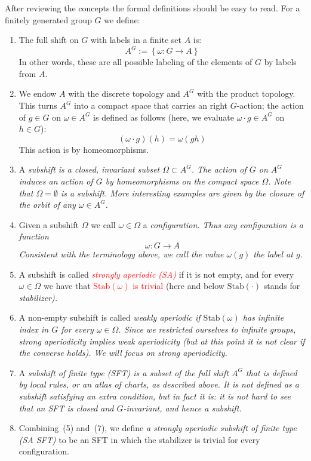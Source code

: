 \documentclass[12pt,reqno]{amsart}
\theoremstyle{plain}
\theoremstyle{definition}
\numberwithin{subcase}{case}
\theoremstyle{plain}
\theoremstyle{definition}
\def\stab[#1]{\mathrm{Stab}(#1)}
\def\cor[#1]{\textcolor{red}{#1}}
\begin{document}
After reviewing the concepts the formal definitions should be easy to read. For a finitely generated group \(G\) we define:

\begin{enumerate}%
\item The full shift on \(G\) with labels in a finite set \(A\) is: 
\[
A^{G} := \left\{ \omega : G \to A\right\}
\]
In other words, these are all possible labeling of the elements of \(G\) by labels from \(A\).

\item We endow \(A\) with the discrete topology and \(A^{G}\) with the product topology. This turns \(A^{G}\) into a compact space that carries an right \(G\)-action; the action of \(g \in G\) on \(\omega \in A^{G}\) is defined as follows (here, we evaluate \(\omega \cdot g \in A^{G}\) on \(h \in G\)):
\[
(\omega \cdot g) (h) = \omega(gh)
\]
This action is by homeomorphisms.

\item A \em subshift \em is a closed, invariant subset \(\Omega \subset A^{G}\). The action of \(G\) on \(A^{G}\) induces an action of \(G\) by homeomorphisms on the compact space \(\Omega\). Note that \(\Omega = \emptyset\) is a subshift. More interesting examples are given by the closure of the orbit of any \(\omega \in A^{G}\).

\item Given a subshift \(\Omega\) we call \(\omega \in \Omega\) a \em configuration\em. Thus any configuration is a function
\[
\omega: G \to A
\]
Consistent with the terminology above, we call the value \(\omega(g)\) the \em label \em at \(g\).

\item A subshift is called \cor[\em strongly aperiodic (SA)] if it is not empty, and for every \(\omega \in \Omega\) we have that \textcolor{red}{\(\stab[\omega]\) is trivial} (here and below \(\stab[\cdot]\) stands for \em stabilizer\em).

\item A non-empty subshift is called \em weakly aperiodic  \em  if \(\stab[\omega]\) has infinite index in \(G\) for every \(\omega \in \Omega\). Since we restricted ourselves to infinite groups, strong aperiodicity implies weak aperiodicity (but at this point it is not clear if the converse holds). We will focus on strong aperiodicity. 

\item A \em subshift of finite type (SFT) \em is a subset of the full shift \(A^{G}\) that is defined by local rules, or an atlas of charts, as described above. It is not defined as a subshift satisfying an extra condition, but in fact it is: it is not hard to see that an SFT is closed and \(G\)-invariant, and hence a subshift.

\item Combining~(5) and~(7), we define {\it a strongly aperiodic subshift of finite type (SA SFT)} to be an SFT in which the stabilizer is trivial for every configuration.

\end{enumerate}
\end{document}
